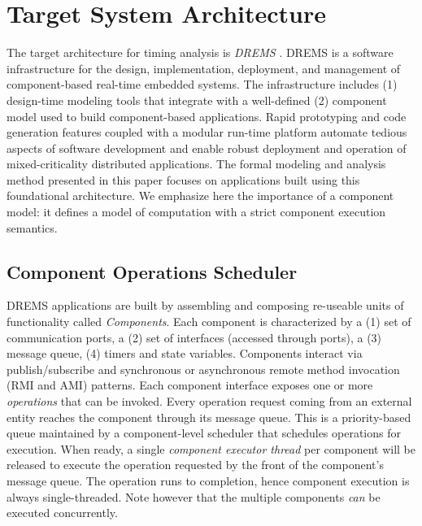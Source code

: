 \section{Target System Architecture}
\label{sec:Target_System_Architecture}
The target architecture for timing analysis is \emph{DREMS} \cite{ISIS_F6_Aerospace:12,DREMS13Software}. DREMS is a software infrastructure for the design, implementation, deployment, and management of component-based real-time embedded systems. The infrastructure includes (1) design-time modeling tools \cite{ISIS_F6_SFFMT:13} that integrate with a well-defined (2) component model \cite{ISIS_F6_ISORC:13, MoDeVVa} used to build component-based applications. Rapid prototyping and code generation features coupled with a modular run-time platform automate tedious aspects of software development and enable robust deployment and operation of mixed-criticality distributed applications. The formal modeling and analysis method presented in this paper focuses on applications built using this foundational architecture. We emphasize here the importance of a component model: it defines a model of computation with a strict component execution semantics. 

\subsection{Component Operations Scheduler}

DREMS applications are built by assembling and composing re-useable units of functionality called \emph{Components}. Each component is characterized by a (1) set of communication ports, a (2) set of interfaces (accessed through ports), a (3) message queue, (4) timers and state variables. Components interact via publish/subscribe and synchronous or asynchronous remote method invocation (RMI and AMI) patterns. Each component interface exposes one or more \emph{operations} that can be invoked. Every operation request coming from an external entity reaches the component through its message queue. This is a priority-based queue maintained by a component-level scheduler that schedules operations for execution. When ready, a single \emph{component executor thread} per component will be released to execute the operation requested by the front of the component's message queue. The operation runs to completion, hence component execution is always single-threaded. Note however that the multiple components \emph{can} be executed concurrently. 



